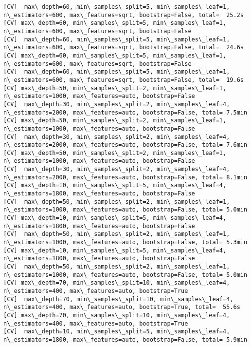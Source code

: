 \documentclass[11pt]{article}
\begin{document}
\begin{Verbatim}[commandchars=\\\{\}]
[CV]  max\_depth=60, min\_samples\_split=5, min\_samples\_leaf=1, n\_estimators=600, max\_features=sqrt, bootstrap=False, total=  25.2s
[CV] max\_depth=60, min\_samples\_split=5, min\_samples\_leaf=1, n\_estimators=600, max\_features=sqrt, bootstrap=False 
[CV]  max\_depth=60, min\_samples\_split=5, min\_samples\_leaf=1, n\_estimators=600, max\_features=sqrt, bootstrap=False, total=  24.6s
[CV] max\_depth=60, min\_samples\_split=5, min\_samples\_leaf=1, n\_estimators=600, max\_features=sqrt, bootstrap=False 
[CV]  max\_depth=60, min\_samples\_split=5, min\_samples\_leaf=1, n\_estimators=600, max\_features=sqrt, bootstrap=False, total=  19.6s
[CV] max\_depth=50, min\_samples\_split=2, min\_samples\_leaf=1, n\_estimators=1000, max\_features=auto, bootstrap=False 
[CV]  max\_depth=30, min\_samples\_split=2, min\_samples\_leaf=4, n\_estimators=2000, max\_features=auto, bootstrap=False, total= 7.5min
[CV] max\_depth=50, min\_samples\_split=2, min\_samples\_leaf=1, n\_estimators=1000, max\_features=auto, bootstrap=False 
[CV]  max\_depth=30, min\_samples\_split=2, min\_samples\_leaf=4, n\_estimators=2000, max\_features=auto, bootstrap=False, total= 7.6min
[CV] max\_depth=50, min\_samples\_split=2, min\_samples\_leaf=1, n\_estimators=1000, max\_features=auto, bootstrap=False 
[CV]  max\_depth=30, min\_samples\_split=2, min\_samples\_leaf=4, n\_estimators=2000, max\_features=auto, bootstrap=False, total= 8.1min
[CV] max\_depth=10, min\_samples\_split=5, min\_samples\_leaf=4, n\_estimators=1800, max\_features=auto, bootstrap=False 
[CV]  max\_depth=50, min\_samples\_split=2, min\_samples\_leaf=1, n\_estimators=1000, max\_features=auto, bootstrap=False, total= 5.0min
[CV] max\_depth=10, min\_samples\_split=5, min\_samples\_leaf=4, n\_estimators=1800, max\_features=auto, bootstrap=False 
[CV]  max\_depth=50, min\_samples\_split=2, min\_samples\_leaf=1, n\_estimators=1000, max\_features=auto, bootstrap=False, total= 5.3min
[CV] max\_depth=10, min\_samples\_split=5, min\_samples\_leaf=4, n\_estimators=1800, max\_features=auto, bootstrap=False 
[CV]  max\_depth=50, min\_samples\_split=2, min\_samples\_leaf=1, n\_estimators=1000, max\_features=auto, bootstrap=False, total= 5.0min
[CV] max\_depth=70, min\_samples\_split=10, min\_samples\_leaf=4, n\_estimators=400, max\_features=auto, bootstrap=True 
[CV]  max\_depth=70, min\_samples\_split=10, min\_samples\_leaf=4, n\_estimators=400, max\_features=auto, bootstrap=True, total=  55.6s
[CV] max\_depth=70, min\_samples\_split=10, min\_samples\_leaf=4, n\_estimators=400, max\_features=auto, bootstrap=True 
[CV]  max\_depth=10, min\_samples\_split=5, min\_samples\_leaf=4, n\_estimators=1800, max\_features=auto, bootstrap=False, total= 5.9min

\end{Verbatim}
\end{document}
